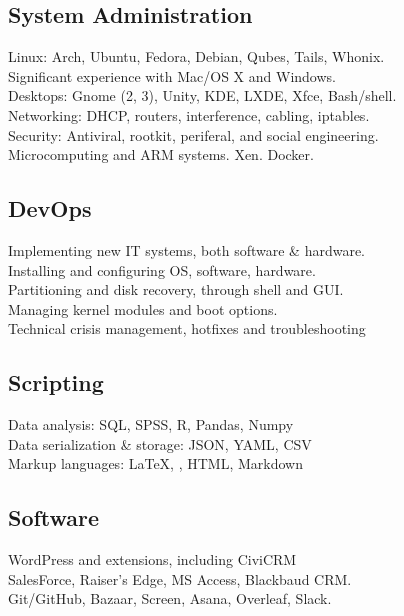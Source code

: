\documentclass[]{deedy-resume-openfont}
\begin{document}
\begin{minipage}[t]{.5\textwidth}
    \subsection{System Administration}
		\textbullet{} Linux: Arch, Ubuntu, Fedora, Debian, Qubes, Tails, Whonix.\\
        \textbullet{} Significant experience with Mac/OS X and Windows. \\
   		\textbullet{} Desktops: Gnome (2, 3), Unity, KDE, LXDE, Xfce, Bash/shell. \\
    	\textbullet{} Networking: DHCP, routers, interference, cabling, iptables.\\
		\textbullet{} Security: Antiviral, rootkit, periferal, and social engineering.\\
        \textbullet{} Microcomputing and ARM systems. Xen. Docker.
    \sectionsep
	\subsection{DevOps}
   		\textbullet{} Implementing new IT systems, both software \& hardware.\\
       	\textbullet{} Installing and configuring OS, software, hardware. \\
        \textbullet{} Partitioning and disk recovery, through shell and GUI. \\
        \textbullet{} Managing kernel modules and boot options.\\
        \textbullet{} Technical crisis management, hotfixes and troubleshooting
    \sectionsep
   	\subsection{Scripting}
        \textbullet{} Data analysis: SQL, SPSS, R, Pandas, Numpy \\
        \textbullet{} Data serialization \& storage: JSON, YAML, CSV \\
        \textbullet{} Markup languages: \LaTeX, \XeLaTeX, HTML, Markdown 
    \sectionsep
    \subsection{Software}
        \textbullet{} WordPress and extensions, including CiviCRM \\
        \textbullet{} SalesForce, Raiser's Edge, MS Access, Blackbaud CRM.\\
        \textbullet{} Git/GitHub, Bazaar, Screen, Asana, Overleaf, Slack.
\end{minipage}
\end{document}
